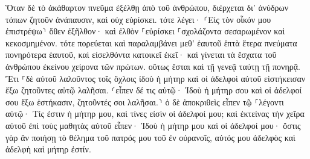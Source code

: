 \documentclass{openreader}
\begin{document}
Ὅταν δὲ τὸ ἀκάθαρτον πνεῦμα ἐξέλθῃ ἀπὸ τοῦ ἀνθρώπου, διέρχεται δι’ ἀνύδρων τόπων ζητοῦν ἀνάπαυσιν, καὶ οὐχ εὑρίσκει. 
τότε λέγει· ⸂Εἰς τὸν οἶκόν μου ἐπιστρέψω⸃ ὅθεν ἐξῆλθον· καὶ ἐλθὸν ⸀εὑρίσκει ⸀σχολάζοντα σεσαρωμένον καὶ κεκοσμημένον. 
τότε πορεύεται καὶ παραλαμβάνει μεθ’ ἑαυτοῦ ἑπτὰ ἕτερα πνεύματα πονηρότερα ἑαυτοῦ, καὶ εἰσελθόντα κατοικεῖ ἐκεῖ· καὶ γίνεται τὰ ἔσχατα τοῦ ἀνθρώπου ἐκείνου χείρονα τῶν πρώτων. οὕτως ἔσται καὶ τῇ γενεᾷ ταύτῃ τῇ πονηρᾷ. 
Ἔτι ⸀δὲ αὐτοῦ λαλοῦντος τοῖς ὄχλοις ἰδοὺ ἡ μήτηρ καὶ οἱ ἀδελφοὶ αὐτοῦ εἱστήκεισαν ἔξω ζητοῦντες αὐτῷ λαλῆσαι. 
⸂εἶπεν δέ τις αὐτῷ· Ἰδοὺ ἡ μήτηρ σου καὶ οἱ ἀδελφοί σου ἔξω ἑστήκασιν, ζητοῦντές σοι λαλῆσαι.⸃ 
ὁ δὲ ἀποκριθεὶς εἶπεν τῷ ⸀λέγοντι αὐτῷ· Τίς ἐστιν ἡ μήτηρ μου, καὶ τίνες εἰσὶν οἱ ἀδελφοί μου; 
καὶ ἐκτείνας τὴν χεῖρα αὐτοῦ ἐπὶ τοὺς μαθητὰς αὐτοῦ εἶπεν· Ἰδοὺ ἡ μήτηρ μου καὶ οἱ ἀδελφοί μου· 
ὅστις γὰρ ἂν ποιήσῃ τὸ θέλημα τοῦ πατρός μου τοῦ ἐν οὐρανοῖς, αὐτός μου ἀδελφὸς καὶ ἀδελφὴ καὶ μήτηρ ἐστίν. 
\end{document}
